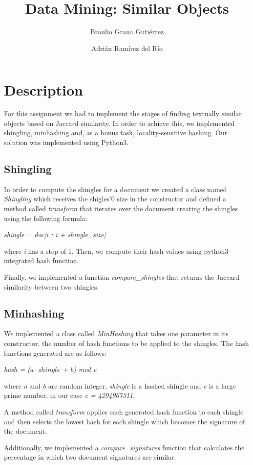 \documentclass[12pt, a4paper]{article}
\title{Data Mining: Similar Objects}
\author{Braulio Grana Guti\'errez \and Adri\'an Ram\'irez del R\'io}
\begin{document}
\maketitle

\section{Description}
For this assignment we had to implement the stages of finding textually similar objects based on Jaccard similarity. In order to achieve this, we implemented shingling, minhashing and, as a bonus task, locality-sensitive hashing. Our solution was implemented using Python3.

\subsection{Shingling}
In order to compute the shingles for a document we created a class named \emph{Shingling} which receives the shigles'0 size in the constructor and defined a method called \emph{transform} that iterates over the document creating the shingles using the following formula:
\begin{center}{\emph{shingle = doc[i : i + shingle\_size]}} \end{center}
where \emph{i} has a step of 1. Then, we compute their hash values using python3 integrated hash function.

Finally, we implemented a function \emph{compare\_shingles} that returns the Jaccard similarity between two shingles.

\subsection{Minhashing}
We implemented a class called \emph{MinHashing} that takes one parameter in its constructor, the number of hash functions to be applied to the shingles. The hash functions generated are as follows:
\begin{center} \emph{hash = ($a \cdot shingle$ + b) mod c} \end{center}
where \emph{a} and \emph{b} are random integer, \emph{shingle} is a hashed shingle and \emph{c} is a large prime number, in our case \emph{c = 4294967311}.

A method called \emph{transform} applies each generated hash function to each shingle and then selects the lowest hash for each shingle which becomes the signature of the document.

Additionally, we implemented a \emph{compare\_signatures} function that calculates the percentage in which two document signatures are similar.
\end{document}
